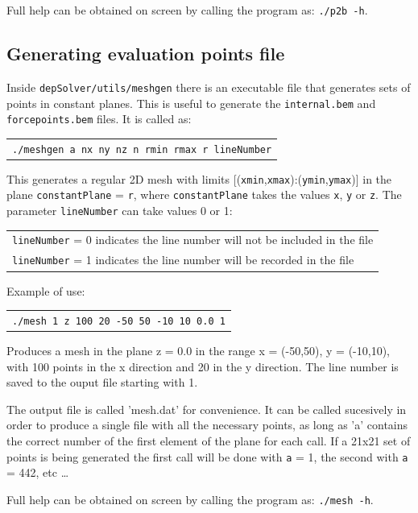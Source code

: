 \documentclass[12pt]{article}
\begin{document}
Full help can be obtained on screen by calling the program as: \texttt{./p2b -h}.

\subsection{Generating evaluation points file}\label{meshgen}
Inside \verb+depSolver/utils/meshgen+ there is an executable file that generates sets of points in constant planes. This is useful to generate the \verb+internal.bem+ and \verb+forcepoints.bem+ files. It is called as:

\begin{tabular}{l}
\texttt{./meshgen a nx ny nz n rmin rmax r lineNumber}
\end{tabular}

This generates a regular 2D mesh with limits [(\verb+xmin+,\verb+xmax+):(\verb+ymin+,\verb+ymax+)] in the plane
\verb+constantPlane+ = \verb+r+, where \verb+constantPlane+ takes the values \verb+x+, \verb+y+ or \verb+z+. The parameter \verb+lineNumber+ can take values 0 or 1:

\begin{tabular}{l}
\texttt{lineNumber} = 0 indicates the line number will not be included in the file\\
\texttt{lineNumber} = 1 indicates the line number will be recorded in the file\\
\end{tabular}

Example of use:

\begin{tabular}{l}
\texttt{./mesh 1 z 100 20 -50 50 -10 10 0.0 1}
\end{tabular}

Produces a mesh in the plane z = 0.0 in the range x = (-50,50), y = (-10,10), with 100 points in the x direction and 20 in the y direction. The line number is saved to the ouput file starting with 1.

The output file is called 'mesh.dat' for convenience. It can be called sucesively in order to produce a single file with all the necessary points, as long as 'a' contains the correct number of the first element of the plane for each call. If a 21x21 set of points is being generated the first call will be done with \verb+a+ = 1, the second with \verb+a+ = 442, etc \ldots

Full help can be obtained on screen by calling the program as: \texttt{./mesh -h}.

\pagebreak
\end{document}
